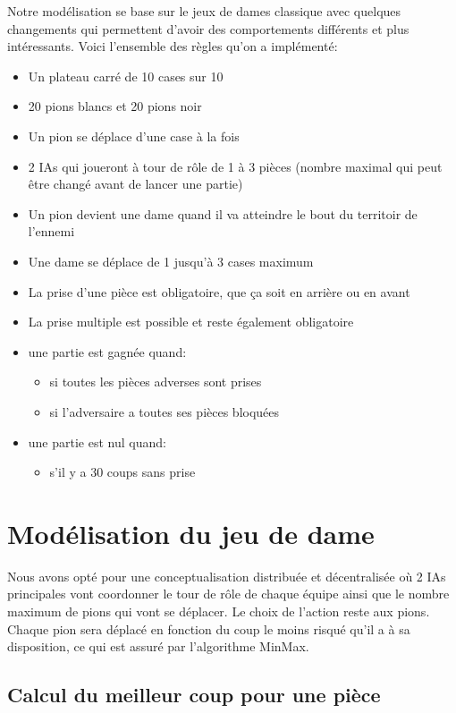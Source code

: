 \documentclass[11pt]{article} %
\begin{document}
Notre modélisation se base sur le jeux de dames classique avec quelques changements qui permettent d'avoir des comportements différents et plus intéressants. 
Voici l’ensemble des règles qu’on a implémenté: 
\begin{itemize}
\item Un plateau carré de 10 cases sur 10
\item 20 pions blancs et 20 pions noir
\item Un pion se déplace d’une case à la fois
\item 2 IAs qui joueront à tour de rôle de 1 à 3 pièces (nombre maximal qui peut être changé avant de lancer une partie)
\item Un pion devient une dame quand il va atteindre le bout du territoir de l’ennemi
\item Une dame se déplace de 1 jusqu’à 3 cases maximum 
\item La prise d’une pièce est obligatoire, que ça soit en arrière ou en avant 
 \item La prise multiple est possible et reste également obligatoire
\item une partie est gagnée quand:
\begin{itemize}
\item si toutes les pièces adverses sont prises
\item si l'adversaire a toutes ses pièces bloquées
\end{itemize}
\item une partie est nul quand:
\begin{itemize}
\item s'il y a 30 coups sans prise
\end{itemize}
\end{itemize}

\section{Modélisation du jeu de dame}

Nous avons opté pour une conceptualisation distribuée et décentralisée où 2 IAs principales vont coordonner le tour de rôle de chaque équipe ainsi que le nombre maximum de pions qui vont se déplacer. Le choix de l’action reste aux pions. Chaque pion sera déplacé en fonction du coup le moins risqué qu’il a à sa disposition, ce qui est assuré par l’algorithme MinMax. 

\subsection{Calcul du meilleur coup pour une pièce}
\end{document}
